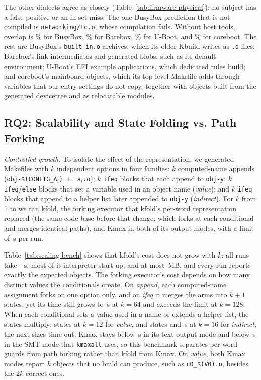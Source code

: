 \documentclass[acmsmall]{acmart}
\newcommand{\tool}{\textsf{kfold}\xspace}
\newcommand{\kmax}{\textsf{Kmax}\xspace}
\begin{document}
The other dialects agree as closely (Table~\ref{tab:firmware-physical}): no subject has a false positive or an in-set miss.
The one BusyBox prediction that is not compiled is \texttt{networking/tc.o}, whose compilation fails.
Without host tools, overlap is \NBusyboxDefconfigOverlapnohost\% for BusyBox, \NBareboxSandboxDefconfigOverlapnohost\% for Barebox, \NUbootSandboxDefconfigOverlapnohost\% for U-Boot, and \NCorebootQemuIFFZfxOverlapnohost\% for coreboot.
The rest are BusyBox's \texttt{built-in.o} archives, which its older Kbuild writes as \texttt{.o} files; Barebox's link intermediates and generated blobs, such as its default environment; U-Boot's EFI example applications, which dedicated rules build; and coreboot's mainboard objects, which its top-level Makefile adds through variables that our entry settings do not copy, together with objects built from the generated devicetree and as relocatable modules.

\subsection{RQ2: Scalability and State Folding vs. Path Forking}
\label{sec:eval:scaling}
\emph{Controlled growth.} To isolate the effect of the representation, we generated Makefiles with $k$ independent options in four families: $k$ computed-name appends (\texttt{obj-\$(CONFIG\_A$_i$) += a$_i$.o}); $k$ \texttt{ifeq} blocks that each append to \texttt{obj-y}; $k$ \texttt{ifeq}/\texttt{else} blocks that set a variable used in an object name (\emph{value}); and $k$ \texttt{ifeq} blocks that append to a helper list later appended to \texttt{obj-y} (\emph{indirect}).
For $k$ from 1 to \NBenchMaxk we ran \tool, the forking executor that \tool's per-word representation replaced (the same code base before that change, which forks at each conditional and merges identical paths), and \kmax in both of its output modes, with a limit of \NBenchTimeout\,s per run.

Table~\ref{tab:scaling-bench} shows that \tool's cost does not grow with $k$: all \NBenchKfoldRuns runs take \NBenchKfoldMinSeconds--\NBenchKfoldMaxSeconds\,s, most of it interpreter start-up, and at most \NBenchKfoldMaxRss\,MB, and every run reports exactly the expected objects.
The forking executor's cost depends on how many distinct values the conditionals create.
On \emph{append}, each computed-name assignment forks on one option only, and on \emph{ifeq} it merges the arms into $k+1$ states, yet its time still grows to \NBenchIfeqSFSeconds\,s at $k=64$ and exceeds the limit at $k=128$.
When each conditional sets a value used in a name or extends a helper list, the states multiply: \NBenchValueOTStates states at $k=12$ for \emph{value}, and \NBenchIndirectOSStates states and \NBenchIndirectOSSeconds\,s at $k=16$ for \emph{indirect}; the next sizes time out.
\kmax stays below \NBenchKmaxMaxSeconds\,s in its text output mode and below \NBenchKmaxSmtMaxSeconds\,s in the SMT mode that \texttt{kmaxall} uses, so this benchmark separates per-word guards from path forking rather than \tool from \kmax.
On \emph{value}, both \kmax modes report $k$ objects that no build can produce, such as \texttt{c0\_\$(V0).o}, besides the $2k$ correct ones.
\end{document}
